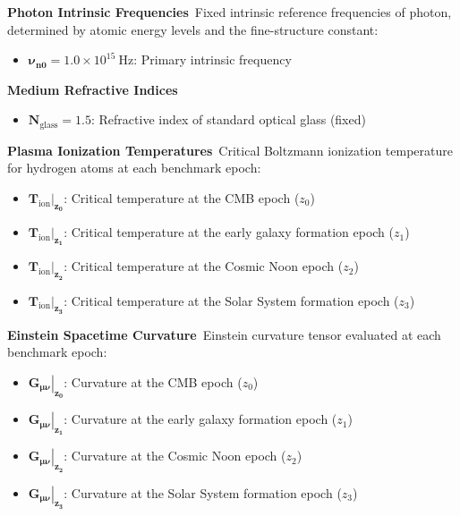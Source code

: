 \documentclass[12pt,leqno]{article}
\begin{document}
	\medskip
	\noindent
	
	{\bf Photon Intrinsic Frequencies}\,\,\,Fixed intrinsic reference frequencies of photon, determined by atomic energy levels and the fine-structure constant:
	\begin{itemize}
		\item $\boldsymbol{\nu_{n0}}=1.0\times10^{15}\ \text{Hz}$: Primary intrinsic frequency
	\end{itemize}
	
	\medskip
	\noindent
	
	{\bf Medium Refractive Indices}\,\,\,
	\begin{itemize}
		\item $\boldsymbol{N}_{\text{glass}}=1.5$: Refractive index of standard optical glass (fixed)
	\end{itemize}
	
	\medskip
	\noindent
	
	{\bf Plasma Ionization Temperatures}\,\,\,Critical Boltzmann ionization temperature for hydrogen atoms at each benchmark epoch:
	\begin{itemize}
		\item $\left.\boldsymbol{T_\mathrm{ion}}\right|_{\boldsymbol{z_0}}$: Critical temperature at the CMB epoch (${z_0}$)
		\item $\left.\boldsymbol{T_\mathrm{ion}}\right|_{\boldsymbol{z_1}}$: Critical temperature at the early galaxy formation epoch (${z_1}$)
		\item $\left.\boldsymbol{T_\mathrm{ion}}\right|_{\boldsymbol{z_2}}$: Critical temperature at the Cosmic Noon epoch (${z_2}$)
		\item $\left.\boldsymbol{T_\mathrm{ion}}\right|_{\boldsymbol{z_3}}$: Critical temperature at the Solar System formation epoch (${z_3}$)
	\end{itemize}
	
	\medskip
	\noindent
	
	{\bf Einstein Spacetime Curvature}\,\,\,Einstein curvature tensor evaluated at each benchmark epoch:
	\begin{itemize}
		\item $\left.\boldsymbol{G_{\mu\nu}}\right|_{\boldsymbol{z_0}}$: Curvature at the CMB epoch (${z_0}$)
		\item $\left.\boldsymbol{G_{\mu\nu}}\right|_{\boldsymbol{z_1}}$: Curvature at the early galaxy formation epoch (${z_1}$)
		\item $\left.\boldsymbol{G_{\mu\nu}}\right|_{\boldsymbol{z_2}}$: Curvature at the Cosmic Noon epoch (${z_2}$)
		\item $\left.\boldsymbol{G_{\mu\nu}}\right|_{\boldsymbol{z_3}}$: Curvature at the Solar System formation epoch (${z_3}$)
	\end{itemize}
	
\end{document}
